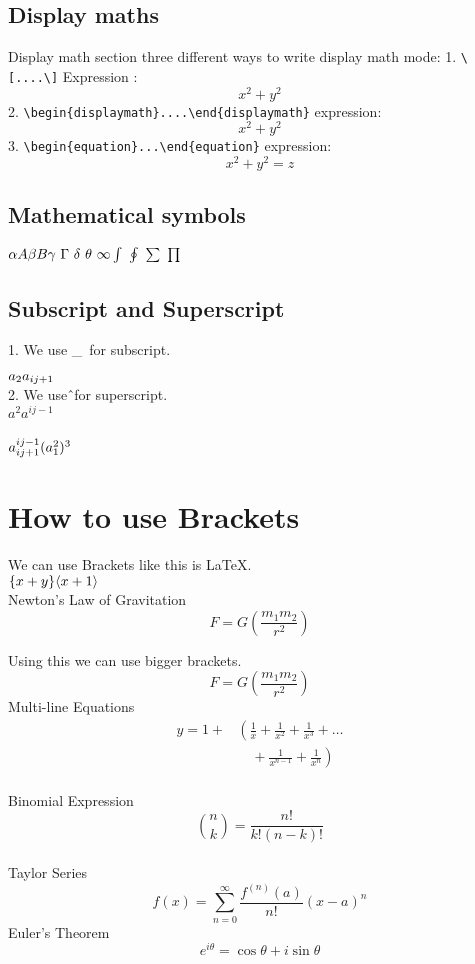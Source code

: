 \documentclass{report}
\begin{document}
\subsection{Display maths}
Display math section
three different ways to write display math mode:
1. \verb|\[....\]| Expression : \[x^2+y^2\]
2. \verb|\begin{displaymath}....\end{displaymath}| expression: \begin{displaymath}x^2+y^2\end{displaymath}
3. \verb|\begin{equation}...\end{equation}| expression: \begin{equation}
    x^2+y^2=z 
\end{equation}
\subsection{Mathematical symbols}
$\alpha A \\
\beta B \\
\gamma \ \Gamma \ \delta \
\theta \ \infty 
\int \ \oint \ \sum \ \prod
$
\subsection{Subscript and Superscript}
1. We use \_\ for subscript.

$
a_2 \\
a_{ij+1}
$ \\
2. We use\^\ for superscript.\\
$
a^2
a^{ij-1}
$ \\
\\
$
 a_{ij+1}^{ij-1}\\
 \\
(a_1^2)^3 \\
$
\section{How to use Brackets}
We can use Brackets like this is \LaTeX. \\

$
\{x+y\} \\
\langle x+1 \rangle
$\\

\noindent Newton's Law of Gravitation
\[F=G(\frac{m_1m_2}{r^2})\] 

\noindent Using this we can use bigger brackets. \\
\[
F=G\left(\frac{m_1m_2}{r^2}\right)
\]
Multi-line Equations \\
\begin{align*}
      y=1+ &\left(\frac{1}{x}+ \frac{1}{x^2} + \frac{1}{x^3} + \ldots \right. \\
        &\left. \quad + \frac{1}{x^{n-1}} + \frac{1}{x^n} \right )
\end{align*}
\\
Binomial Expression
\[\binom{n}{k}=\frac{n!}{k!(n-k)!}\] \\
Taylor Series
\[f(x)=\sum_{n=0}^{\infty} \frac{f^{(n)}(a)}{n!}(x-a)^n\]
Euler's Theorem
\[e^{i \theta}=\cos \theta + i \sin \theta\]
\end{document}
